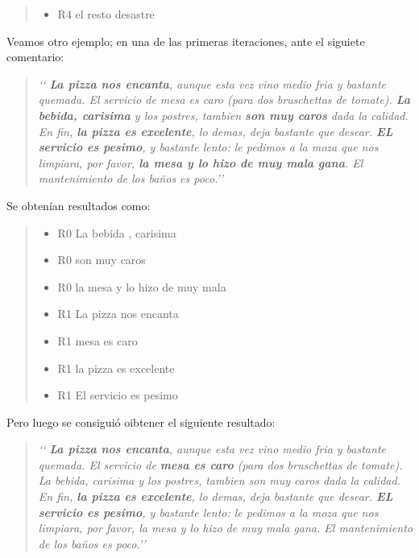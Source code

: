 \begin{quotation}
\begin{itemize}
\item R4  el resto desastre
\end{itemize}
\end{quotation}

Veamos otro ejemplo; en una de las primeras iteraciones, ante el siguiete comentario:

\begin{quotation}
\emph{
\lq\lq{} {\bf La pizza nos encanta}, aunque esta vez vino medio fria y bastante quemada. El servicio de mesa es caro (para dos bruschettas de tomate). {\bf La bebida, carisima} y los postres, tambien {\bf son muy caros} dada la calidad. En fin, {\bf la pizza es excelente}, lo demas, deja bastante que desear. {\bf EL servicio es pesimo}, y bastante lento: le pedimos a la moza que nos limpiara, por favor, {\bf la mesa y lo hizo de muy mala gana}. El mantenimiento de los baños es poco.\rq\rq{}
}

\end{quotation}

Se obtenían resultados como:

\begin{quotation}
\begin{itemize}
\item R0  La bebida , carisima 
\item R0 son muy caros
\item R0 la mesa y lo hizo de muy mala
\item R1 La pizza nos encanta
\item R1 mesa es caro
\item R1 la pizza es excelente
\item R1 El servicio es pesimo
\end{itemize}
\end{quotation}

Pero luego se consiguió oibtener el siguiente resultado:

\begin{quotation}
\emph{
\lq\lq{} {\bf La pizza nos encanta}, aunque esta vez vino medio fria y bastante quemada. El servicio de {\bf mesa es caro} (para dos bruschettas de tomate). La bebida, carisima y los postres, tambien son muy caros dada la calidad. En fin, {\bf la pizza es excelente}, lo demas, deja bastante que desear. {\bf EL servicio es pesimo}, y bastante lento: le pedimos a la moza que nos limpiara, por favor, la mesa y lo hizo de muy mala gana. El mantenimiento de los baños es poco.\rq\rq{}
}

\end{quotation}


